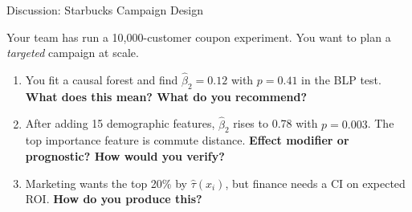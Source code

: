 \documentclass[aspectratio=169, 11pt, handout]{beamer}
\begin{document}
\begin{frame}{Discussion: Starbucks Campaign Design}
 
Your team has run a 10,000-customer coupon experiment. You want to plan a \emph{targeted} campaign at scale.
 
\bigskip
 
\begin{enumerate}
    \item You fit a causal forest and find $\hat{\beta}_2 = 0.12$ with $p = 0.41$ in the BLP test. \textbf{What does this mean? What do you recommend?}
 
    \pause
    \bigskip
 
    \item After adding 15 demographic features, $\hat{\beta}_2$ rises to 0.78 with $p = 0.003$. The top importance feature is commute distance. \textbf{Effect modifier or prognostic? How would you verify?}
 
    \pause
    \bigskip
 
    \item Marketing wants the top 20\% by $\hat{\tau}(x_i)$, but finance needs a CI on expected ROI. \textbf{How do you produce this?}
\end{enumerate}
 
\end{frame}
 
\end{document}
